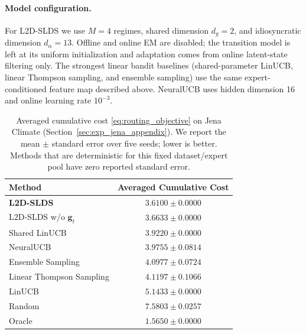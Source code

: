 \paragraph{Model configuration.}
For L2D-SLDS we use \(M=4\) regimes, shared dimension \(d_g=2\), and idiosyncratic dimension
\(d_\alpha=13\). Offline and online EM are disabled; the transition model is left at its uniform
initialization and adaptation comes from online latent-state filtering only. The strongest linear
bandit baselines (shared-parameter LinUCB, linear Thompson sampling, and ensemble sampling) use the
same expert-conditioned feature map described above. NeuralUCB uses hidden dimension 16 and online
learning rate \(10^{-3}\).

\begin{table}[ht]
\centering
\small
\setlength{\tabcolsep}{4pt}
\caption{Averaged cumulative cost \eqref{eq:routing_objective} on Jena Climate (Section~\ref{sec:exp_jena_appendix}).
We report the mean \(\pm\) standard error over five seeds; lower is better. Methods that are
deterministic for this fixed dataset/expert pool have zero reported standard error.}
\label{tab:exp_avg_costs_jena_appendix}
\begin{tabular}{@{}lc@{}}
\toprule
Method & Averaged Cumulative Cost \\
\midrule
\textbf{L2D-SLDS} & \(\mathbf{3.6100 \pm 0.0000}\) \\
L2D-SLDS w/o \(\mathbf{g}_t\) & \(3.6633 \pm 0.0000\) \\
\midrule
Shared LinUCB & \(3.9220 \pm 0.0000\) \\
NeuralUCB & \(3.9755 \pm 0.0814\) \\
Ensemble Sampling & \(4.0977 \pm 0.0724\) \\
Linear Thompson Sampling & \(4.1197 \pm 0.1066\) \\
LinUCB & \(5.1433 \pm 0.0000\) \\
Random & \(7.5803 \pm 0.0257\) \\
Oracle & \(1.5650 \pm 0.0000\) \\
\bottomrule
\end{tabular}
\end{table}

